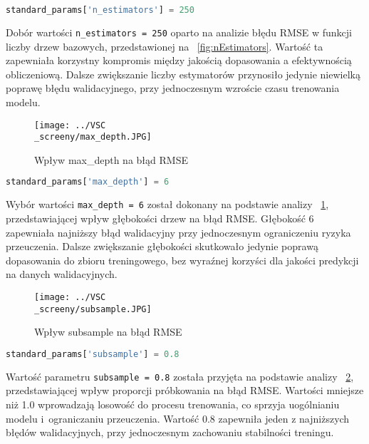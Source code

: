 \documentclass[12pt,a4paper]{report}
\theoremstyle{definition} %
\begin{document}
	\begin{lstlisting}[language=Python,caption=Dodawanie hiperparametru 'n\_estimators' do słownika standard\_params,label={KodPython4}]
	standard_params['n_estimators'] = 250
	\end{lstlisting}
	
	Dobór wartości \texttt{n\_estimators = 250} oparto na analizie błędu RMSE w funkcji liczby drzew bazowych, przedstawionej na \figurename~\ref{fig:nEstimators}. Wartość ta zapewniała korzystny kompromis między jakością dopasowania a efektywnością obliczeniową. Dalsze zwiększanie liczby estymatorów przynosiło jedynie niewielką poprawę błędu walidacyjnego, przy jednoczesnym wzroście czasu trenowania modelu.

	
	\begin{figure}[H]
	    \centering
	    \texttt{[image: ../VSC\\\_screeny/max\_depth.JPG]} 
	    \caption{Wpływ max\_depth na błąd RMSE}
	    \label{fig:maxDepth}
	\end{figure}
	
	\begin{lstlisting}[language=Python,caption=Dodawanie hiperparametru 'max\_depth' do słownika standard\_params,label={KodPython5}]
	standard_params['max_depth'] = 6
	\end{lstlisting}

	Wybór wartości \texttt{max\_depth = 6} został dokonany na podstawie analizy \figurename~\ref{fig:maxDepth}, przedstawiającej wpływ głębokości drzew na błąd RMSE. Głębokość 6 zapewniała najniższy błąd walidacyjny przy jednoczesnym ograniczeniu ryzyka przeuczenia. Dalsze zwiększanie głębokości skutkowało jedynie poprawą dopasowania do zbioru treningowego, bez wyraźnej korzyści dla jakości predykcji na danych walidacyjnych.
	
	\begin{figure}[H]
	    \centering
	    \texttt{[image: ../VSC\\\_screeny/subsample.JPG]} 
	    \caption{Wpływ subsample na błąd RMSE}
	    \label{fig:subsample}
	\end{figure}
	
	\begin{lstlisting}[language=Python,caption=Dodawanie hiperparametru 'subsample' do słownika standard\_params,label={KodPython6}]
	standard_params['subsample'] = 0.8
	\end{lstlisting}

	Wartość parametru \texttt{subsample = 0.8} została przyjęta na podstawie analizy \figurename~\ref{fig:subsample}, przedstawiającej wpływ proporcji próbkowania na błąd RMSE. Wartości mniejsze niż 1.0 wprowadzają losowość do procesu trenowania, co sprzyja uogólnianiu modelu i~ograniczaniu przeuczenia. Wartość 0.8 zapewniła jeden z najniższych błędów walidacyjnych, przy jednoczesnym zachowaniu stabilności treningu.
	
\end{document}
